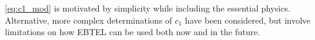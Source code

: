 \autoref{eq:c1_mod} is motivated by simplicity while including the essential physics. Alternative, more complex determinations of $c_1$ have been considered, but involve limitations on how EBTEL can be used both now and in the future.

